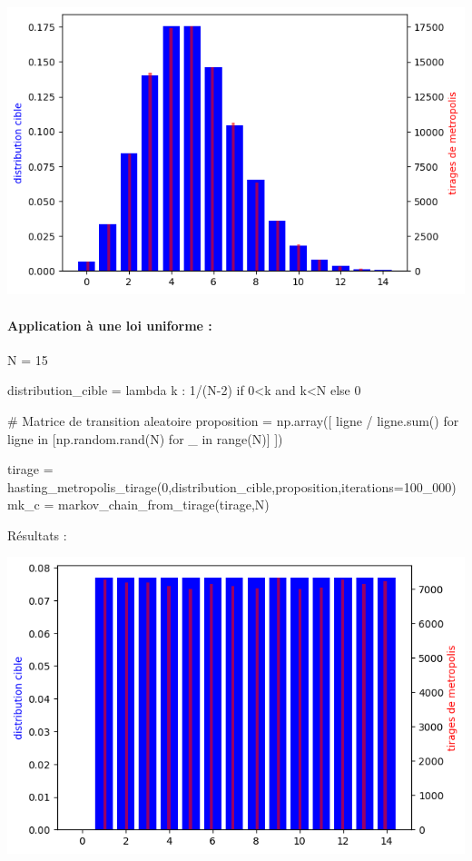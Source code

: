 \documentclass{article}
\begin{document}
\includegraphics[scale=0.5]{poisson.png}

\newpage
\paragraph{Application à une loi uniforme :}
\begin{center}
\begin{python}
N = 15

distribution_cible = lambda k : 1/(N-2) if 0<k and k<N else 0

# Matrice de transition aleatoire
proposition = np.array([ ligne / ligne.sum()
    for ligne in [np.random.rand(N) for _ in range(N)]
])


tirage = hasting_metropolis_tirage(0,distribution_cible,proposition,iterations=100_000)
mk_c = markov_chain_from_tirage(tirage,N)
\end{python}
\end{center}
Résultats :

\includegraphics[scale=0.5]{uniforme.png}
\end{document}

